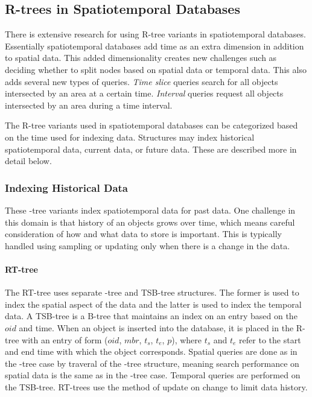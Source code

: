 \subsection{R-trees in Spatiotemporal Databases}
There is extensive research for using R-tree variants in spatiotemporal
databases. Essentially spatiotemporal databases add time as an extra dimension
in addition to spatial data. This added dimensionality creates new challenges
such as deciding whether to split nodes based on spatial data or temporal data. 
This also adds several new types of queries. \emph{Time slice}
queries search for all objects intersected by an area at a certain time. 
\emph{Interval} queries request all objects intersected by an area during a time
interval.

The R-tree variants used in spatiotemporal databases can be categorized based
on the time used for indexing data. Structures may index historical 
spatiotemporal data, current data, or future data. These are described more
in detail below.

\subsubsection{Indexing Historical Data}
These \rbase-tree variants index spatiotemporal data for past data. One challenge
in this domain is that history of an objects grows over time, which means 
careful consideration of how and what data to store is important. This is 
typically handled using sampling or updating only when there is a change in the
data. 

\paragraph{RT-tree} The RT-tree\cite{xu1990rt} uses separate \rbase-tree and 
TSB-tree structures. The former is used 
to index the spatial aspect of the data and the latter is used to index
the temporal data. A TSB-tree is a B-tree that maintains an index on an 
entry based on the $oid$ and time. When an object is inserted into the 
database, it is placed in the R-tree with an entry of form 
($oid$, $mbr$, $t_s$, $t_e$, $p$), where $t_s$ and $t_e$ refer to the 
start and end time with which the object corresponds. Spatial queries 
are done as in the \rbase-tree case by traveral of the \rbase-tree 
structure, meaning search performance on spatial data is the same as in 
the \rbase-tree case. Temporal queries are performed on the TSB-tree. 
RT-trees use the method of update on change to limit data history.

